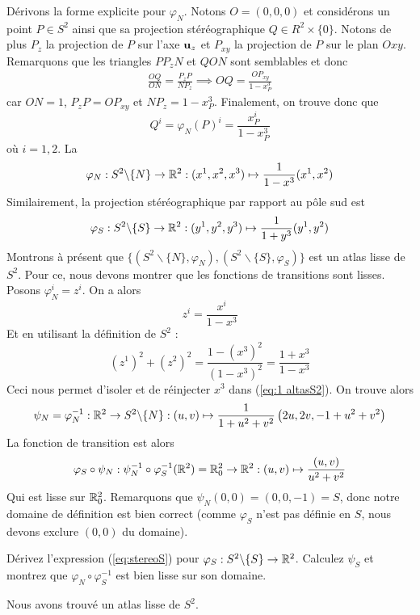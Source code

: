 Dérivons la forme explicite pour $\varphi_N$. Notons $O = (0,0,0)$ et considérons un point $P\in S^2$ ainsi que sa projection stéréographique $Q \in R^2 \times \{0\}$. Notons de plus $P_z$ la projection de $P$ sur l'axe $\bm{\mathrm{u}}_z$ et $P_{xy}$ la projection de $P$ sur le plan $Oxy$. Remarquons que les triangles $PP_zN$ et $QON$ sont semblables et donc
\begin{align}
    \frac{OQ}{ON} = \frac{P_zP}{NP_z} \implies OQ = \frac{OP_{xy}}{1-x^3_P}
\end{align}
car $ON = 1$, $P_zP = OP_{xy}$ et $NP_z = 1 - x^3_P$. Finalement, on trouve donc que 
\begin{equation}
    Q^i = \varphi_N(P)^i = \frac{x^i_P}{1-x^3_P}
\end{equation}
où $i=1,2$. La 
\begin{equation}
\label{eq:stereoN}
    \varphi_N : S^2\backslash\{N\} \to \mathbb{R}^2 : (x^1,x^2,x^3) \mapsto \frac{1}{1-x^3} (x^1,x^2)
\end{equation}
Similairement, la projection stéréographique par rapport au pôle sud est
\begin{equation}
    \label{eq:stereoS}
    \varphi_S:S^2\backslash \{S\} \to \mathbb{R}^2 : (y^1,y^2,y^3) \mapsto \frac{1}{1+y^3} (y^1,y^2)
\end{equation}
Montrons à présent que $\{ (S^2\backslash\{N\}, \varphi_N), (S^2\backslash\{S\}, \varphi_S)\}$ est un atlas lisse de $S^2$. Pour ce, nous devons montrer que les fonctions de transitions sont lisses. Posons $\varphi_N^i = z^i$. On a alors
\begin{equation}
\label{eq:1 altasS2}
    z^i = \frac{x^i}{1-x^3}
\end{equation}
Et en utilisant la définition de $S^2$ :
\begin{equation}
    (z^1)^2 + (z^2)^2 = \frac{1 - (x^3)^2}{(1-x^3)^2} = \frac{1 + x^3}{1-x^3}
\end{equation}
Ceci nous permet d'isoler et de réinjecter $x^3$ dans (\ref{eq:1 altasS2}). On trouve alors
\begin{equation}
    \psi_N = \varphi_N^{-1}: \mathbb{R}^2 \to S^2\backslash \{N\}:(u,v) \mapsto \frac{1}{1+u^2 +v^2} \left( 2 u,2v, -1 + u^2+v^2 \right)
\end{equation}
La fonction de transition est alors
\begin{align}
    \varphi_S \circ \psi_N : \psi^{-1}_N \circ \varphi^{-1}_S(\mathbb{R}^2) = \mathbb{R}^2_0 \to \mathbb{R}^2 : (u,v) \mapsto \frac{(u,v)}{u^2+v^2}
\end{align}
Qui est lisse sur $\mathbb{R}^2_0$. Remarquons que $\psi_N(0,0) = (0,0,-1)=S$, donc notre domaine de définition est bien correct (comme $\varphi_S$ n'est pas définie en $S$, nous devons exclure $(0,0)$ du domaine).
\begin{exerc}
    Dérivez l'expression (\ref{eq:stereoS}) pour $\varphi_S : S^2\backslash \{ S\} \to \mathbb{R}^2$. Calculez $\psi_S$ et montrez que $\varphi_N \circ \varphi_S^{-1}$ est bien lisse sur son domaine. 
\end{exerc}
Nous avons trouvé un atlas lisse de $S^2$.
